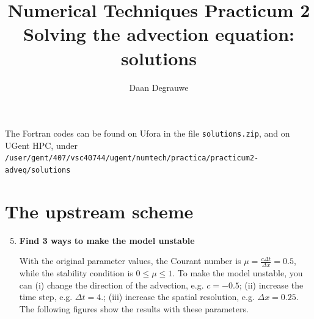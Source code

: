 \documentclass[a4paper,fleqn]{article}
\title{%
	\bfseries%
	{\large Numerical Techniques Practicum 2}\\[3ex]
	{\Large Solving the advection equation: solutions}
}
\author{Daan Degrauwe}
\begin{document}
%
\maketitle
%
The Fortran codes can be found on Ufora in the file \texttt{solutions.zip}, and on UGent HPC, under \texttt{/user/gent/407/vsc40744/ugent/numtech/practica/practicum2-adveq/solutions}
\setcounter{section}{1}
%
\section{The upstream scheme}
%
\begin{enumerate}
	\setcounter{enumi}{4}
	\item \textbf{Find 3 ways to make the model unstable}
		\par
		With the original parameter values, the Courant number is $\mu=\frac{c\Delta t}{\Delta x}=0.5$, while the stability condition is $0\leq\mu\leq 1$. To make the model unstable, you can (i) change the direction of the advection, e.g. $c=-0.5$; (ii) increase the time step, e.g. $\Delta t=4.$; (iii) increase the spatial resolution, e.g. $\Delta x=0.25$. The following figures show the results with these parameters.
		\begin{center}
			\hspace*{-50mm}
			\begin{tabular}{ccc}

\end{tabular}
\end{center}
\end{enumerate}
\end{document}
